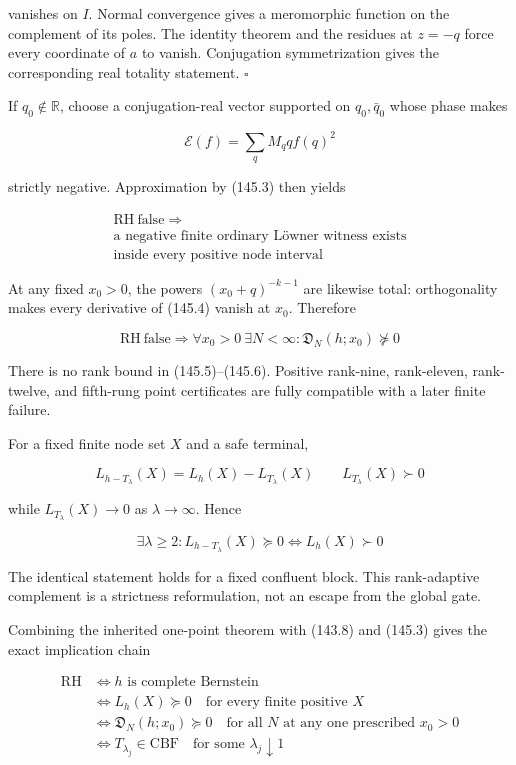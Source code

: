 \documentclass[
  11pt,
]{book}
\begin{document}
vanishes on \(I\). Normal convergence gives a meromorphic function on
the complement of its poles. The identity theorem and the residues at
\(z=-q\) force every coordinate of \(a\) to vanish. Conjugation
symmetrization gives the corresponding real totality statement.
\(\square\)

If \(q_0\notin\mathbb R\), choose a conjugation-real vector supported on
\(q_0,\bar q_0\) whose phase makes

\[
\mathcal E(f)=\sum_qM_qqf(q)^2
\]

strictly negative. Approximation by (145.3) then yields

\[
\boxed{\begin{gathered}
\mathrm{RH\ false}\Longrightarrow\\
\text{a negative finite ordinary Löwner witness exists}\\
\text{inside every positive node interval}
\end{gathered}}
\tag{145.5}
\]

At any fixed \(x_0>0\), the powers \((x_0+q)^{-k-1}\) are likewise
total: orthogonality makes every derivative of (145.4) vanish at
\(x_0\). Therefore

\[
\boxed{
\mathrm{RH\ false}\Longrightarrow
\forall x_0>0\ \exists N<\infty:
\mathfrak D_N(h;x_0)\not\succeq0}
\tag{145.6}
\]

There is no rank bound in (145.5)--(145.6). Positive rank-nine,
rank-eleven, rank-twelve, and fifth-rung point certificates are fully
compatible with a later finite failure.

For a fixed finite node set \(X\) and a safe terminal,

\[
L_{h-T_\lambda}(X)=L_h(X)-L_{T_\lambda}(X)
\qquad
L_{T_\lambda}(X)\succ0
\]

while \(L_{T_\lambda}(X)\to0\) as \(\lambda\to\infty\). Hence

\[
\boxed{
\exists\lambda\ge2:
L_{h-T_\lambda}(X)\succeq0
\iff L_h(X)\succ0}
\tag{145.7}
\]

The identical statement holds for a fixed confluent block. This
rank-adaptive complement is a strictness reformulation, not an escape
from the global gate.

Combining the inherited one-point theorem with (143.8) and (145.3) gives
the exact implication chain

\[
\boxed{
\begin{aligned}
\mathrm{RH}
&\iff h\text{ is complete Bernstein}\\
&\iff L_h(X)\succeq0
\quad\text{for every finite positive }X\\
&\iff \mathfrak D_N(h;x_0)\succeq0
\quad\text{for all }N
\text{ at any one prescribed }x_0>0\\
&\iff T_{\lambda_j}\in\mathrm{CBF}
\quad\text{for some }\lambda_j\downarrow1
\end{aligned}}
\tag{145.8}
\]
\end{document}
